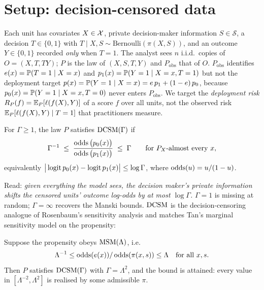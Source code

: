 \section{Setup: decision-censored data}
\label{sec:setup}

Each unit has covariates $X\in\mathcal{X}$, private decision-maker information
$S\in\mathcal{S}$, a decision $T\in\{0,1\}$ with
$T\mid X,S\sim\text{Bernoulli}(\pi(X,S))$, and an outcome $Y\in\{0,1\}$
recorded \emph{only} when $T=1$. The analyst sees $n$ i.i.d.\ copies of
$O=(X,T,TY)$; $P$ is the law of $(X,S,T,Y)$ and $P_{\mathrm{obs}}$ that of
$O$. $P_{\mathrm{obs}}$ identifies $e(x)=\mathbb{P}(T=1\mid X=x)$ and
$p_1(x)=\mathbb{P}(Y=1\mid X=x,T=1)$ but not the deployment target
$p(x)=\mathbb{P}(Y=1\mid X=x)=e\,p_1+(1-e)\,p_0$, because
$p_0(x)=\mathbb{P}(Y=1\mid X=x,T=0)$ never enters $P_{\mathrm{obs}}$. We target the
\emph{deployment risk} $R_P(f)=\mathbb{E}_P[\ell(f(X),Y)]$ of a score $f$ over all
units, not the observed risk $\mathbb{E}_P[\ell(f(X),Y)\mid T=1]$ that practitioners
measure.

\begin{definition}[$\dcsm(\Gamma)$]
\label{def:dcsm}
For $\Gamma\ge 1$, the law $P$ satisfies $\dcsm(\Gamma)$ if
\begin{equation}
  \Gamma^{-1}
  \;\le\;
  \frac{\operatorname{odds}\big(p_0(x)\big)}{\operatorname{odds}\big(p_1(x)\big)}
  \;\le\;
  \Gamma
  \qquad\text{for $P_X$-almost every } x,
  \label{eq:dcsm}
\end{equation}
equivalently $\big|\operatorname{logit} p_0(x) - \operatorname{logit} p_1(x)\big| \le \log\Gamma$, where
$\operatorname{odds}(u) = u/(1-u)$.
\end{definition}

Read: \emph{given everything the model sees, the decision maker's private
information shifts the censored units' outcome log-odds by at most
$\log\Gamma$.} $\Gamma=1$ is missing at random; $\Gamma=\infty$ recovers the
Manski bounds. $\textup{DCSM}$ is the decision-censoring analogue of Rosenbaum's
sensitivity analysis \citep{rosenbaum2002observational} and matches Tan's
marginal sensitivity model \citep{tan2006distributional} on the propensity:

\begin{lemma}
\label{lem:msm}
Suppose the propensity obeys $\textup{MSM}(\Lambda)$, i.e.
\[
  \Lambda^{-1}\le \operatorname{odds}(e(x))/\operatorname{odds}(\pi(x,s)) \le \Lambda
  \quad\text{for all } x,s.
\]
Then $P$ satisfies $\dcsm(\Gamma)$ with $\Gamma=\Lambda^{2}$, and the bound is
attained: every value in $[\Lambda^{-2},\Lambda^{2}]$ is realised by some
admissible $\pi$.
\end{lemma}

